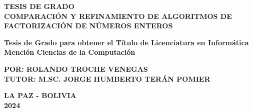 \begin{titlepage}
\begin{center}
		{\fontsize{16}{20}\selectfont \textbf{TESIS DE GRADO}}\\
		
        {\fontsize{16}{18}\selectfont \textbf{COMPARACIÓN Y REFINAMIENTO DE ALGORITMOS DE FACTORIZACIÓN DE NÚMEROS ENTEROS}}
		
		{\fontsize{12}{12}\selectfont\textbf{Tesis de Grado para obtener el Título de Licenciatura en Informática Mención Ciencias de la Computación}}
		
		{\fontsize{16}{16}\selectfont\textbf{POR: ROLANDO TROCHE VENEGAS}}\\
    	{\fontsize{14}{14}\selectfont\textbf{TUTOR: M.SC. JORGE HUMBERTO TERÁN POMIER}}
		 
		\textbf{LA PAZ - BOLIVIA\\
		2024}
	\end{center}
\end{titlepage}
\restoregeometry